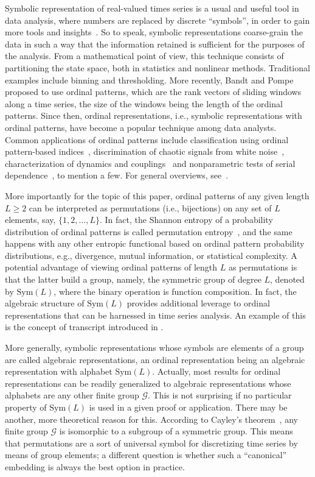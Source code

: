 \documentclass{article}
\begin{document}
Symbolic representation of real-valued times series is a usual and useful
tool in data analysis, where numbers are replaced by discrete
``symbols'', {in order to gain more tools and insights~\cite{Hirata2023}.} So to speak, symbolic representations coarse-grain the data in such a way that the information retained is sufficient for the purposes of the analysis. From a mathematical point of view, this technique consists of partitioning the state space, both in
statistics and nonlinear methods. Traditional examples include binning and thresholding. More recently, Bandt and Pompe~\cite{Bandt2002} proposed to use ordinal patterns, which are the rank vectors of sliding windows along a time series, the size of the windows being the length of the ordinal patterns. Since then, ordinal representations, i.e., symbolic representations with ordinal patterns, have become a popular technique among
data analysts. {Common applications of ordinal patterns include classification using ordinal pattern-based indices~\mbox{\cite{Keller2003,Graff2013,Schlemmer2018}}, discrimination of chaotic signals from white noise~\cite{Rosso2007,Amigo2007}, characterization of dynamics and couplings~\cite{Bandt2002,Monetti2009,Parlitz2013} and nonparametric tests
of serial dependence~\cite{Weiss2022,Weiss2022B}, to mention a few.} For general
overviews, see~\cite{Amigo2013,Leyva2022,Amigo2023}.

More importantly for the topic of this paper, ordinal patterns of any given
length $L\geq 2$ can be interpreted as permutations (i.e., bijections) on
any set of $L$ elements, say, $\{1,2,\ldots,L\}$. In fact, the Shannon entropy
of a probability distribution of ordinal patterns is called permutation
entropy~\cite{Bandt2002}, and the same happens with any other entropic
functional based on ordinal pattern probability distributions, e.g.,
divergence, mutual information, or statistical complexity. A potential
advantage of viewing ordinal patterns of length $L$ as permutations is that
the latter build a group, namely, the symmetric group of degree $L$, denoted
by $\mathrm{Sym}(L)$, where the binary operation is function composition. In
fact, the algebraic structure of $\mathrm{Sym}(L)$ provides additional
leverage to ordinal representations that can be harnessed in time series
analysis. An example of this is the concept of transcript introduced in \cite%
{Monetti2009}.

More generally, symbolic representations whose symbols are elements of a
group are called algebraic representations, an ordinal representation being
an algebraic representation with alphabet $\mathrm{Sym}(L)$. Actually, most
results for ordinal representations can be readily generalized to algebraic
representations whose alphabets are any other finite group $\mathcal{G}$.
This is not surprising if no particular property of $\mathrm{Sym}(L)$ is
used in a given proof or application. There may be another, more theoretical
reason for this. According to Cayley's theorem~\cite{Herstein1996}, any
finite group $\mathcal{G}$ is isomorphic to a subgroup of a symmetric group.
This means that permutations are a sort of universal symbol for
discretizing time series by means of group elements; a different question is
whether such a ``canonical'' embedding is
always the best option in practice.
\end{document}

